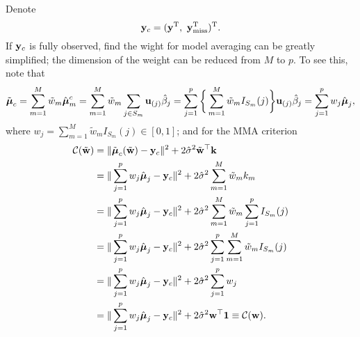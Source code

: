 \documentclass[12pt,hidelinks]{article}
\begin{document}

Denote
\begin{equation}\label{Yc}
  \mathbf{y}_c=(\mathbf{y}^{\rm T},\ \mathbf{y}_{\mathrm{miss}}^{\rm T})^{\rm T}.
\end{equation}
If $\mathbf{y}_c$ is fully observed, find the wight for model averaging can be greatly simplified; the dimension of the weight can be reduced from $M$ to $p$. To see this, note that
\begin{equation}\label{eq:1}
  \tilde{{\boldsymbol{\mu}}}_c =
  \sum_{m=1}^M\tilde{w}_m\hat{\boldsymbol{\mu}}_m^c
  =\sum_{m=1}^M\tilde{w}_m\sum_{j\in S_m}\mathbf{u}_{(j)}\hat{\beta}_j
  =\sum_{j=1}^p\bigg\{\sum_{m=1}^M
  \tilde{w}_mI_{S_m}(j)\bigg\}\mathbf{u}_{(j)}\hat{\beta}_j
  =\sum_{j=1}^pw_j\hat{\boldsymbol{\mu}}_j,
\end{equation}
where $w_j=\sum_{m=1}^M\tilde{w}_mI_{S_m}(j)\in[0,1]$; and 
for the MMA criterion
\begin{align}\label{M-criterion}
  {\cal C}(\tilde{\mathbf{w}})
  &=\|\tilde{\boldsymbol{\mu}}_c(\tilde{\mathbf{w}})-\mathbf{y}_c\|^2+2\hat{\sigma}^2 \tilde{\mathbf{w}}^{\top}\mathbf{k}\\
  &=\|\sum_{j=1}^pw_j\hat{\boldsymbol{\mu}}_j-\mathbf{y}_c\|^2
    +2\hat{\sigma}^2\sum_{m=1}^M\tilde{w}_mk_m\\
  &=\|\sum_{j=1}^pw_j\hat{\boldsymbol{\mu}}_j-\mathbf{y}_c\|^2
    +2\hat{\sigma}^2\sum_{m=1}^M\tilde{w}_m\sum_{j=1}^pI_{S_m}(j)\\
  &=\|\sum_{j=1}^pw_j\hat{\boldsymbol{\mu}}_j-\mathbf{y}_c\|^2
    +2\hat{\sigma}^2\sum_{j=1}^p \sum_{m=1}^M \tilde{w}_mI_{S_m}(j)\\
  &=\|\sum_{j=1}^pw_j\hat{\boldsymbol{\mu}}_j-\mathbf{y}_c\|^2
    +2\hat{\sigma}^2\sum_{j=1}^p w_j\\
  &=\|\sum_{j=1}^pw_j\hat{\boldsymbol{\mu}}_j-\mathbf{y}_c\|^2
    +2\hat{\sigma}^2\mathbf{w}^{\top}\mathbf{1}
    \equiv{\cal C}(\mathbf{w}).
\end{align}
\end{document}
